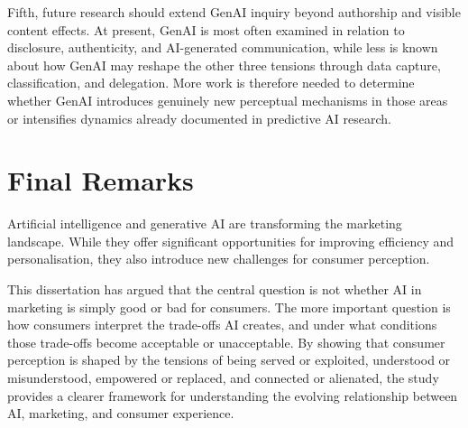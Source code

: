 Fifth, future research should extend GenAI inquiry beyond authorship and visible content effects. At present, GenAI is most often examined in relation to disclosure, authenticity, and AI-generated communication, while less is known about how GenAI may reshape the other three tensions through data capture, classification, and delegation. More work is therefore needed to determine whether GenAI introduces genuinely new perceptual mechanisms in those areas or intensifies dynamics already documented in predictive AI research.

\section{Final Remarks}
Artificial intelligence and generative AI are transforming the marketing landscape. While they offer significant opportunities for improving efficiency and personalisation, they also introduce new challenges for consumer perception.

This dissertation has argued that the central question is not whether AI in marketing is simply good or bad for consumers. The more important question is how consumers interpret the trade-offs AI creates, and under what conditions those trade-offs become acceptable or unacceptable. By showing that consumer perception is shaped by the tensions of being served or exploited, understood or misunderstood, empowered or replaced, and connected or alienated, the study provides a clearer framework for understanding the evolving relationship between AI, marketing, and consumer experience.
